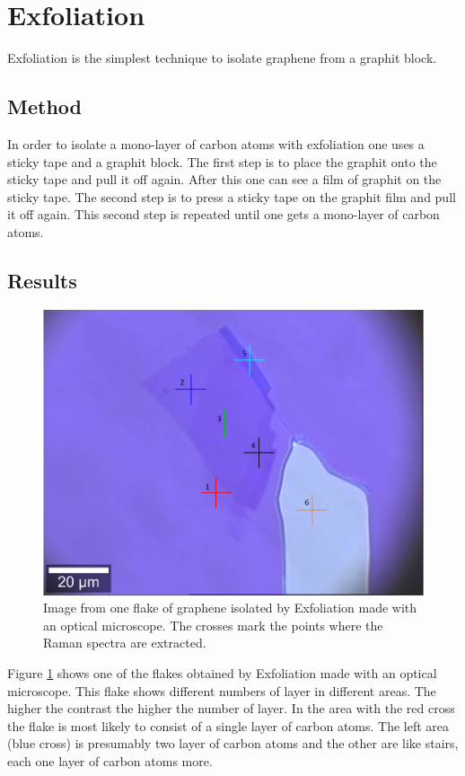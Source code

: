 \documentclass[12pt,a4paper]{article}
\begin{document}
\section{Exfoliation}
\label{sec:3}
Exfoliation is the simplest technique to isolate graphene from a graphit block.

\subsection{Method}
In order to isolate a mono-layer of carbon atoms with exfoliation one uses a sticky tape and a graphit block. The first step is to place the graphit onto the sticky tape and pull it off again. After this one can see a film of graphit on the sticky tape. The second step is to press a sticky tape on the graphit film and pull it off again. This second step is repeated until one gets a mono-layer of carbon atoms.

\subsection{Results}

\begin{figure}[h]
\centering
\includegraphics[scale=0.35]{Bilder/Exfoliation/mono_bi_tri_flake.PNG}
\caption{Image from one flake of graphene isolated by Exfoliation made with an optical microscope. The crosses mark the points where the Raman spectra are extracted.}
\label{fig:Exfoliation_Microscope}
\end{figure}

Figure \ref{fig:Exfoliation_Microscope} shows one of the flakes obtained by Exfoliation made with an optical microscope. This flake shows different numbers of layer in different areas. The higher the contrast the higher the number of layer. In the area with the red cross the flake is most likely to consist of a single layer of carbon atoms. The left area (blue cross) is presumably two layer of carbon atoms and the other are like stairs, each one layer of carbon atoms more.
\end{document}
